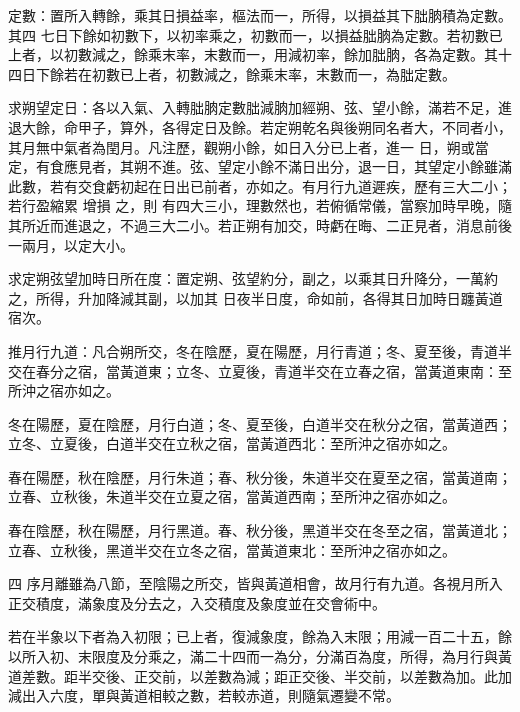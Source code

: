 \begin{pinyinscope}
 定數：置所入轉餘，乘其日損益率，樞法而一，所得，以損益其下朏朒積為定數。其四
 七日下餘如初數下，以初率乘之，初數而一，以損益朏朒為定數。若初數已上者，以初數減之，餘乘末率，末數而一，用減初率，餘加朏朒，各為定數。其十四日下餘若在初數已上者，初數減之，餘乘末率，末數而一，為朏定數。



 求朔望定日：各以入氣、入轉朏朒定數朏減朒加經朔、弦、望小餘，滿若不足，進退大餘，命甲子，算外，各得定日及餘。若定朔乾名與後朔同名者大，不同者小，其月無中氣者為閏月。凡注歷，觀朔小餘，如日入分已上者，進一
 日，朔或當定，有食應見者，其朔不進。弦、望定小餘不滿日出分，退一日，其望定小餘雖滿此數，若有交食虧初起在日出已前者，亦如之。有月行九道遲疾，歷有三大二小；若行盈縮累
 增損
 之，則
 有四大三小，理數然也，若俯循常儀，當察加時早晚，隨其所近而進退之，不過三大二小。若正朔有加交，時虧在晦、二正見者，消息前後一兩月，以定大小。



 求定朔弦望加時日所在度：置定朔、弦望約分，副之，以乘其日升降分，一萬約之，所得，升加降減其副，以加其
 日夜半日度，命如前，各得其日加時日躔黃道宿次。



 推月行九道：凡合朔所交，冬在陰歷，夏在陽歷，月行青道；冬、夏至後，青道半交在春分之宿，當黃道東；立冬、立夏後，青道半交在立春之宿，當黃道東南：至所沖之宿亦如之。



 冬在陽歷，夏在陰歷，月行白道；冬、夏至後，白道半交在秋分之宿，當黃道西；立冬、立夏後，白道半交在立秋之宿，當黃道西北：至所沖之宿亦如之。



 春在陽歷，秋在陰歷，月行朱道；春、秋分後，朱道半交在夏至之宿，當黃道南；立春、立秋後，朱道半交在立夏之宿，當黃道西南；至所沖之宿亦如之。



 春在陰歷，秋在陽歷，月行黑道。春、秋分後，黑道半交在冬至之宿，當黃道北；立春、立秋後，黑道半交在立冬之宿，當黃道東北：至所沖之宿亦如之。



 四
 序月離雖為八節，至陰陽之所交，皆與黃道相會，故月行有九道。各視月所入正交積度，滿象度及分去之，入交積度及象度並在交會術中。



 若在半象以下者為入初限；已上者，復減象度，餘為入末限；用減一百二十五，餘以所入初、末限度及分乘之，滿二十四而一為分，分滿百為度，所得，為月行與黃道差數。距半交後、正交前，以差數為減；距正交後、半交前，以差數為加。此加減出入六度，單與黃道相較之數，若較赤道，則隨氣遷變不常。




\end{pinyinscope}
